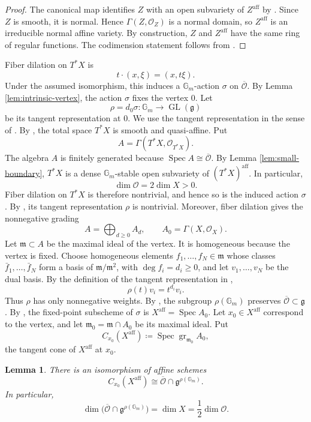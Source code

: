 \documentclass[10pt,a4paper]{amsart}
\newtheorem{lemma}[theorem]{Lemma}
\DeclareMathOperator{\Spec}{Spec}
\newcommand{\Gm}{\mathbb G_m}
\newcommand{\aff}{\mathrm{aff}}
\begin{document}
\begin{proof}
The canonical map identifies $Z$ with an open subvariety of
$Z^{\aff}$ by \cite[Lemma 28.19.4]{Stacks}.
Since $Z$ is smooth, it is normal. Hence
$\Gamma(Z,\mathcal O_Z)$ is a normal domain, so $Z^{\aff}$ is an
irreducible normal affine variety.
By construction, $Z$ and $Z^{\aff}$ have the same ring of regular
functions. The codimension statement follows from
\cite[Theorem 4.2]{Grosshans}.
\end{proof}
Fiber dilation on $T^*X$ is
\[
t\cdot(x,\xi)=(x,t\xi).
\]
Under the assumed isomorphism, this induces a $\Gm$-action $\sigma$ on
$\overline{\mathcal O}$. By Lemma \ref{lem:intrinsic-vertex}, the
action $\sigma$ fixes the vertex $0$. Let
\[
\rho=d_0\sigma:\Gm\longrightarrow\operatorname{GL}(\mathfrak g)
\]
be its tangent representation at $0$. We use the tangent representation
in the sense of \cite[Section 5]{Jia}. By \cite[Lemma 4.5]{Jia}, the
total space $T^*X$ is smooth and quasi-affine. Put
\[
A=\Gamma(T^*X,\mathcal O_{T^*X}).
\]
The algebra $A$ is finitely generated because
$\Spec A\cong\overline{\mathcal O}$. By Lemma
\ref{lem:small-boundary}, $T^*X$ is a dense $\Gm$-stable open
subvariety of $(T^*X)^{\aff}$. In particular,
\[
\dim\mathcal O=2\dim X>0.
\]
Fiber dilation on $T^*X$ is therefore nontrivial, and hence so is the
induced action $\sigma$.
By \cite[Lemma 5.1]{Jia}, its tangent representation $\rho$ is
nontrivial.
Moreover, fiber dilation gives the nonnegative grading
\[
A=\bigoplus_{d\geq0}A_d,
\qquad
A_0=\Gamma(X,\mathcal O_X).
\]
Let $\mathfrak m\subset A$ be the maximal ideal of the vertex.
It is homogeneous because the vertex is fixed.
Choose homogeneous elements $f_1,\ldots,f_N\in\mathfrak m$ whose
classes $\bar f_1,\ldots,\bar f_N$ form a basis of
$\mathfrak m/\mathfrak m^2$, with $\deg f_i=d_i\geq0$, and let
$v_1,\ldots,v_N$ be the dual basis.
By the definition of the tangent representation in \cite[Section 5]{Jia},
\[
\rho(t)v_i=t^{d_i}v_i.
\]
Thus $\rho$ has only nonnegative weights.
By \cite[Lemma 5.2]{Jia}, the subgroup $\rho(\Gm)$ preserves
$\overline{\mathcal O}\subset\mathfrak g$.
By \cite[Lemma 5.4]{Jia}, the fixed-point subscheme of $\sigma$ is
$X^{\aff}=\Spec A_0$.
Let $x_0\in X^{\aff}$ correspond to the vertex, and let
$\mathfrak m_0=\mathfrak m\cap A_0$ be its maximal ideal. Put
\[
C_{x_0}(X^{\aff})
\coloneqq
\Spec\operatorname{gr}_{\mathfrak m_0}A_0,
\]
the tangent cone of $X^{\aff}$ at $x_0$.

\begin{lemma}\label{lem:fixed-tangent-cone}
There is an isomorphism of affine schemes
\[
C_{x_0}(X^{\aff})
\cong
\overline{\mathcal O}\cap
\mathfrak g^{\rho(\Gm)}.
\]
In particular,
\[
\dim\bigl(\overline{\mathcal O}\cap\mathfrak g^{\rho(\Gm)}\bigr)
=\dim X=\frac12\dim\mathcal O.
\]
\end{lemma}
\end{document}
